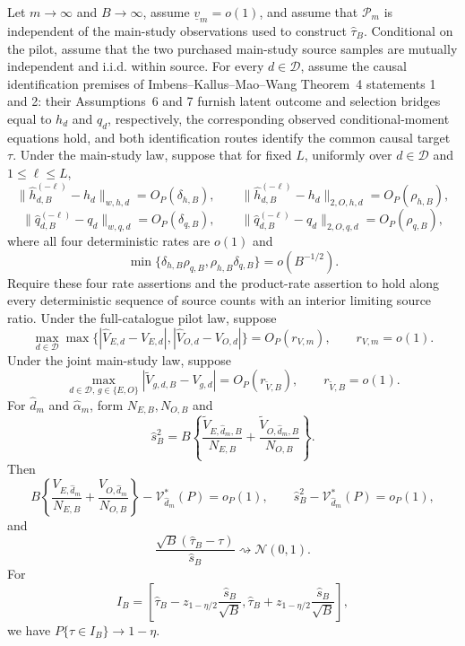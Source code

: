 Let \(m\to\infty\) and \(B\to\infty\), assume \(\underline v_m=o(1)\), and assume that \(\mathcal P_m\) is independent of the main-study observations used to construct \(\widehat\tau_B\).  Conditional on the pilot, assume that the two purchased main-study source samples are mutually independent and i.i.d. within source.  For every \(d\in\mathcal D\), assume the causal identification premises of Imbens--Kallus--Mao--Wang Theorem~4 statements 1 and 2: their Assumptions~6 and 7 furnish latent outcome and selection bridges equal to \(h_d\) and \(q_d\), respectively, the corresponding observed conditional-moment equations hold, and both identification routes identify the common causal target \(\tau\).  Under the main-study law, suppose that for fixed \(L\), uniformly over \(d\in\mathcal D\) and \(1\le\ell\le L\),
\[
 \|\widehat h_{d,B}^{(-\ell)}-h_d\|_{w,h,d}=O_P(\delta_{h,B}),
 \qquad
 \|\widehat h_{d,B}^{(-\ell)}-h_d\|_{2,O,h,d}=O_P(\rho_{h,B}),
\]
\[
 \|\widehat q_{d,B}^{(-\ell)}-q_d\|_{w,q,d}=O_P(\delta_{q,B}),
 \qquad
 \|\widehat q_{d,B}^{(-\ell)}-q_d\|_{2,O,q,d}=O_P(\rho_{q,B}),
\]
where all four deterministic rates are \(o(1)\) and
\[
 \min\{\delta_{h,B}\rho_{q,B},\rho_{h,B}\delta_{q,B}\}
 =o(B^{-1/2}).
\]
Require these four rate assertions and the product-rate assertion to hold along every deterministic sequence of source counts with an interior limiting source ratio.  Under the full-catalogue pilot law, suppose
\[
 \max_{d\in\mathcal D}\max\{|
 \widehat V_{E,d}-V_{E,d}|,|
 \widehat V_{O,d}-V_{O,d}|\}=O_P(r_{V,m}),
 \qquad r_{V,m}=o(1).
\]
Under the joint main-study law, suppose
\[
 \max_{d\in\mathcal D,\,g\in\{E,O\}}
 |\widetilde V_{g,d,B}-V_{g,d}|=O_P(r_{\widetilde V,B}),
 \qquad r_{\widetilde V,B}=o(1).
\]
For \(\widehat d_m\) and \(\widehat\alpha_m\), form \(N_{E,B},N_{O,B}\) and
\[
 \widehat s_B^2
 =B\left\{
 \frac{\widetilde V_{E,\widehat d_m,B}}{N_{E,B}}
 +\frac{\widetilde V_{O,\widehat d_m,B}}{N_{O,B}}
 \right\}.
\]
Then
\[
 B\left\{
 \frac{V_{E,\widehat d_m}}{N_{E,B}}
 +\frac{V_{O,\widehat d_m}}{N_{O,B}}
 \right\}
 -\mathcal V_{\widehat d_m}^*(P)=o_P(1),
 \qquad
 \widehat s_B^2-\mathcal V_{\widehat d_m}^*(P)=o_P(1),
\]
and
\[
 \frac{\sqrt B(\widehat\tau_B-\tau)}{\widehat s_B}
 \rightsquigarrow\mathcal N(0,1).
\]
For
\[
 I_B=\left[
 \widehat\tau_B-z_{1-\eta/2}\frac{\widehat s_B}{\sqrt B},
 \widehat\tau_B+z_{1-\eta/2}\frac{\widehat s_B}{\sqrt B}
 \right],
\]
we have \(P\{\tau\in I_B\}\to1-\eta\).